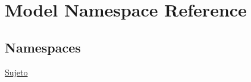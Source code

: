 \hypertarget{namespace_model}{}\section{Model Namespace Reference}
\label{namespace_model}
\subsection*{Namespaces}
\begin{DoxyCompactItemize}
\item 
 \hyperlink{namespace_model_1_1_sujeto}{Sujeto}
\end{DoxyCompactItemize}
